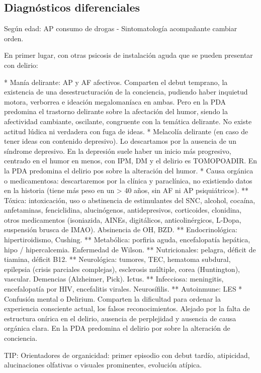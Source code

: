 \documentclass{scrbook}
\begin{document}
\subsection*{Diagnósticos diferenciales}
Según edad: AP consumo de drogas - Sintomatología acompañante cambiar orden.

En primer lugar, con otras psicosis de instalación aguda que se pueden presentar con delirio:

* Manía delirante: AP y AF afectivos. Comparten el debut temprano, la existencia de una desestructuración de la conciencia, pudiendo haber inquietud motora, verborrea e ideación megalomaníaca en ambas. Pero en la PDA predomina el trastorno delirante sobre la afectación del humor, siendo la afectividad cambiante, oscilante, congruente con la temática delirante. No existe actitud lúdica ni verdadera con fuga de ideas.
* Melacolía delirante (en caso de tener ideas con contenido depresivo). Lo descartamos por la ausencia de un síndrome depresivo. En la depresión suele haber un inicio más progresivo, centrado en el humor en menos, con IPM, DM y el delirio es TOMOPOADIR. En la PDA predomina el delirio pos sobre la alteración del humor.
* Causa orgánica o medicamentosa: descartaremos por la clínica y paraclínica, no existiendo datos en la historia (tiene más peso en un > 40 años, sin AF ni AP psiquiátricos).
** Tóxica: intoxicación, uso o abstinencia de estimulantes del SNC, alcohol, cocaína, anfetaminas, fenciclidina, alucinógenos, antidepresivos, corticoides, clonidina, otros medicamentos (isoniazida, AINEs, digitálicos, anticolinérgicos, L-Dopa, suspensión brusca de IMAO). Absinencia de OH, BZD.
** Endocrinológica: hipertiroidismo, Cushing.
** Metabólica: porfiria aguda, encefalopatía hepática, hipo / hipercalcemia. Enfermedad de Wilson.
** Nutricionales: pelagra, déficit de tiamina, déficit B12.
** Neurológica: tumores, TEC, hematoma subdural, epilepsia (crisis parciales complejas), esclerosis múltiple, corea (Huntington), vascular. Demencias (Alzheimer, Pick). Ictus.
** Infecciosa: meningitis, encefalopatía por HIV, encefalitis virales. Neurosífilis.
** Autoinmune: LES
* Confusión mental o Delirium. Comparten la dificultad para ordenar la experiencia consciente actual, los falsos reconocimientos. Alejado por la falta de estructura onírica en el delirio, ausencia de perplejidad y ausencia de causa orgánica clara. En la PDA predomina el delirio por sobre la alteración de conciencia.

TIP: Orientadores de organicidad: primer episodio con debut tardío, atipicidad, alucinaciones olfativas o visuales prominentes, evolución atípica.
\end{document}
